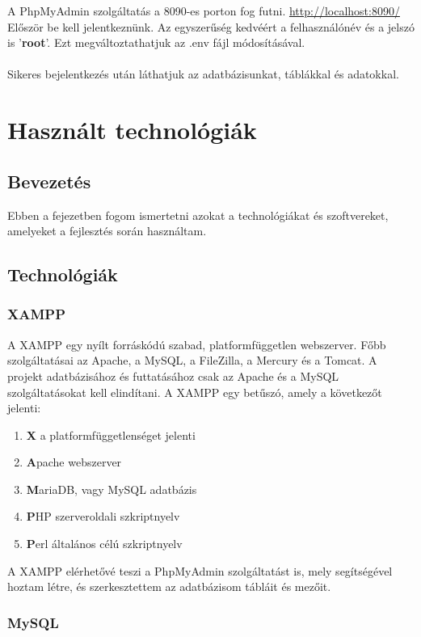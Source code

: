 \documentclass[
]{thesis-ekf}
\theoremstyle{definition}
\theoremstyle{remark}
\begin{document}
A PhpMyAdmin szolgáltatás a 8090-es porton fog futni. \url{http://localhost:8090/}
\\
Először be kell jelentkeznünk. Az egyszerűség kedvéért a felhasználónév és a jelszó is '\textbf{root}'. Ezt megváltoztathatjuk az .env fájl módosításával.
\\\\
Sikeres bejelentkezés után láthatjuk az adatbázisunkat, táblákkal és adatokkal.

\chapter{Használt technológiák}
\section{Bevezetés}
Ebben a fejezetben fogom ismertetni azokat a technológiákat és szoftvereket, amelyeket a fejlesztés során használtam.
\section{Technológiák}

\subsection{XAMPP}

A XAMPP egy nyílt forráskódú szabad, platformfüggetlen webszerver. Főbb szolgáltatásai az Apache, a MySQL, a FileZilla, a Mercury és a Tomcat. A projekt adatbázisához és futtatásához csak az Apache és a MySQL szolgáltatásokat kell elindítani. A XAMPP egy betűszó, amely a következőt jelenti:

\begin{enumerate}
	\item \textbf{X} a platformfüggetlenséget jelenti
	\item \textbf{A}pache webszerver
	\item \textbf{M}ariaDB, vagy MySQL adatbázis
	\item \textbf{P}HP szerveroldali szkriptnyelv
	\item \textbf{P}erl általános célú szkriptnyelv
\end{enumerate}
\noindent
A XAMPP elérhetővé teszi a PhpMyAdmin szolgáltatást is, mely segítségével hoztam létre, és szerkesztettem az adatbázisom tábláit és mezőit.

\subsection{MySQL}
\end{document}
